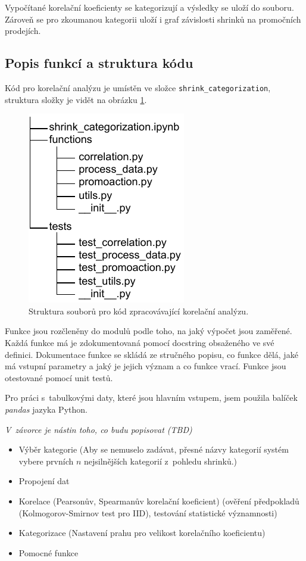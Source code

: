 Vypočítané korelační koeficienty se kategorizují a výsledky se uloží do souboru. Zároveň se pro zkoumanou kategorii uloží i graf závislosti shrinků na promočních prodejích.


\subsection{Popis funkcí a struktura kódu}

Kód pro korelační analýzu je umístěn ve složce \texttt{shrink\_categorization}, struktura složky je vidět na obrázku \ref*{obr:strukturaslozky}.

\begin{figure}[hbtp!]
    \captionsetup{justification=centering}
    \includegraphics[width=.3\textwidth]{obrazky/strukturaslozky.pdf}
    \caption{Struktura souborů pro kód zpracovávající korelační analýzu.}
    \label{obr:strukturaslozky}
\end{figure}

Funkce jsou rozčleněny do modulů podle toho, na jaký výpočet jsou zaměřené. Každá funkce má je zdokumentovaná pomocí docstring obsaženého ve své definici. Dokumentace funkce se skládá ze stručného popisu, co funkce dělá, jaké má vstupní parametry a jaký je jejich význam a co funkce vrací. Funkce jsou otestované pomocí unit testů.

Pro práci s~tabulkovými daty, které jsou hlavním vstupem, jsem použila balíček \emph{pandas} jazyka Python.

\emph{V~závorce je nástin toho, co budu popisovat (TBD)}

\begin{itemize}
    \item Výběr kategorie (Aby se nemuselo zadávat, přesné názvy kategorií systém vybere prvních $n$ nejsilnějších kategorií z~pohledu shrinků.)
    \item Propojení dat
    \item Korelace (Pearsonův, Spearmanův korelační koeficient) (ověření předpokladů (Kolmogorov-Smirnov test pro IID), testování statistické významnosti)
    \item Kategorizace (Nastavení prahu pro velikost korelačního koeficientu)
    \item Pomocné funkce
\end{itemize}

